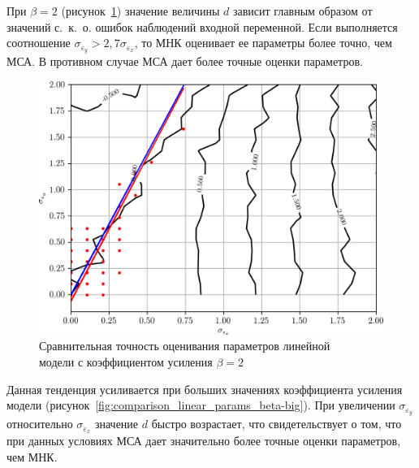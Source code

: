 \pagebreak
При \( \beta = 2 \) (рисунок~\ref{fig:comparison_linear_params_beta-2})
значение величины \( d \) зависит главным образом от значений с.~к.~о. ошибок
наблюдений входной переменной.
Если выполняется соотношение \( \sigma_{\varepsilon_y} > 2{,}7 \sigma_{\varepsilon_x} \),
то МНК оценивает ее параметры более точно, чем МСА.
В противном случае МСА дает более точные оценки параметров.

\begin{figure}[h]
  \centering
  \includegraphics[width=135mm]{fig/linear/param/beta-2_param-accs-approx.png}
  \caption{%
    Сравнительная точность оценивания параметров линейной \\
    модели с коэффициентом усиления \( \beta = 2 \)
  }\label{fig:comparison_linear_params_beta-2}
\end{figure}

Данная тенденция усиливается при больших значениях коэффициента усиления модели
(рисунок~\ref{fig:comparison_linear_params_beta-big}).
При увеличении \( \sigma_{\varepsilon_y} \) относительно \( \sigma_{\varepsilon_x} \) значение
\( d \) быстро возрастает, что свидетельствует о том,
что при данных условиях МСА дает значительно более точные оценки параметров, чем МНК.

